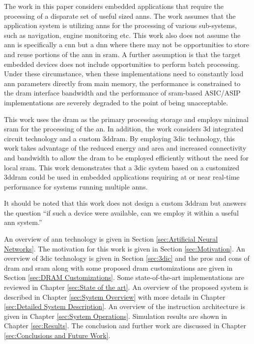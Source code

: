 The work in this paper considers embedded applications that require the processing of a disparate set of useful sized \ac{ann}s. The work assumes that the application system is utilizing \ac{ann}s
for the processing of various sub-systems, such as navigation, engine monitoring etc. This work also does not assume the \ac{ann} is specifically a \ac{cnn} but a \ac{dnn} where there may
not be opportunities to store and reuse portions of the \ac{ann} in \ac{sram}. A further assumption is that the target embedded devices does not include opportunities to perform batch processing.
Under these circumstance, when these implementations need to constantly load \ac{ann} parameters directly from main memory, the performance is constrained to the \ac{dram} interface bandwidth and the performance of \ac{sram}-based ASIC/ASIP implementations are severely degraded to the point of being unacceptable.

This work uses the \ac{dram} as the primary processing storage and employs minimal \ac{sram} for the processing of the \ac{an}.
In addition, the work considers \ac{3d} integrated circuit technology and a custom \ac{3ddram}. By employing \ac{3dic} technology, this work takes advantage of the reduced energy and area and increased
connectivity and bandwidth to allow the \ac{dram} to be employed efficiently without the need for local \ac{sram}.
This work demonstrates that a \ac{3dic} system based on a customized \ac{3ddram} could be used in embedded applications requiring at or near real-time performance for systems running multiple \ac{ann}s.

It should be noted that this work does not design a custom \ac{3ddram} but answers the question ``if such a device were available, can we employ it within a useful \ac{ann} system.''

\hfill %

An overview of \ac{ann} technology is given in Section \ref{sec:Artificial Neural Networks}.
The motivation for this work is given in Section \ref{sec:Motivation}.
An overview of \ac{3dic} technology is given in Section \ref{sec:3dic} and the pros and cons of \ac{dram} and \ac{sram} along with some proposed \ac{dram} customizations are given in Section \ref{sec:DRAM Customizations}.
Some state-of-the-art implementations are reviewed in Chapter \ref{sec:State of the art}.
An overview of the proposed system is described in Chapter \ref{sec:System Overview} with more details in Chapter \ref{sec:Detailed System Description}.
An overview of the instruction architecture is given in Chapter \ref{sec:System Operations}.
Simulation results are shown in Chapter \ref{sec:Results}.
The conclusion and further work are discussed in Chapter \ref{sec:Conclusions and Future Work}.


